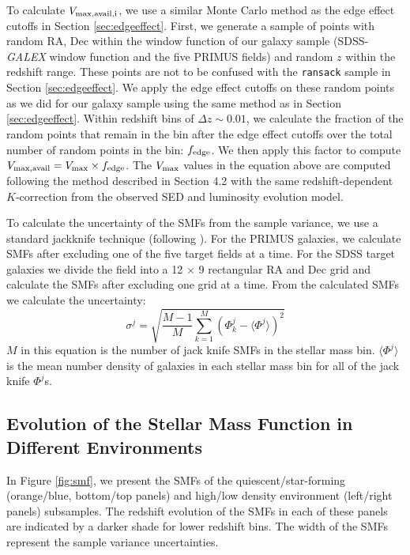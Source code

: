 \documentclass{emulateapj}
\begin{document}
To calculate $V_{\rm{max,avail},i}$, we use a similar Monte Carlo
method as the edge effect cutoffs in Section
\ref{sec:edgeeffect}. First, we generate a sample of points with
random RA, Dec within the window function of our galaxy sample
(SDSS-{\em GALEX} window function and the five PRIMUS fields) and
random $z$ within the redshift range. These points are not to be
confused with the \texttt{ransack} sample in Section
\ref{sec:edgeeffect}. We apply the edge effect cutoffs on these random
points as we did for our galaxy sample using the same method as in
Section \ref{sec:edgeeffect}. Within redshift bins of $\Delta z \sim
0.01$, we calculate the fraction of the random points that remain in
the bin after the edge effect cutoffs over the total number of random
points in the bin: $f_{\rm{edge}}$. We then apply this factor to
compute $V_{\rm{max,avail}} = V_{\rm{max}} \times f_{\rm{edge}}$. The
$V_{\rm{max}}$ values in the equation above are computed following the
method described in \cite{Moustakas:2013aa} Section 4.2 with the same
redshift-dependent $K$-correction from the observed SED and luminosity
evolution model.

To calculate the uncertainty of the SMFs from the sample variance, we use a standard jackknife technique (following \citealt{Moustakas:2013aa}). For the PRIMUS galaxies, we calculate SMFs after excluding one of the five target fields at a time. For the SDSS target galaxies we divide the field into a 12 $\times$ 9 rectangular RA and Dec grid and calculate the SMFs after excluding one grid at a time. From the calculated SMFs we calculate the uncertainty: 
\begin{equation}
\sigma^j = \sqrt{\frac{M-1}{M} \sum\limits_{k=1}^{M} (\Phi^j_k - \langle \Phi^j \rangle)^2}
\end{equation} 
$M$ in this equation is the number of jack knife SMFs in the stellar mass bin. $\langle \Phi^j \rangle$ is the mean number density of galaxies in each stellar mass bin for all of the jack knife $\Phi^j$s. 

\subsection{Evolution of the Stellar Mass Function in Different Environments} \label{sec:smfevol}
In Figure \ref{fig:smf}, we present the SMFs of the quiescent/star-forming (orange/blue, bottom/top panels) and high/low density environment (left/right panels) subsamples. The redshift evolution of the SMFs in each of these panels are indicated by a darker shade for lower redshift bins. The width of the SMFs represent the sample variance uncertainties.
\end{document}
